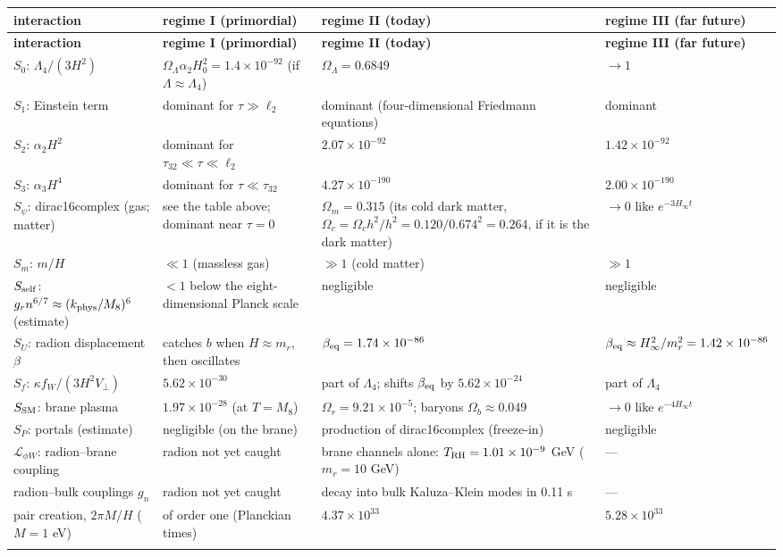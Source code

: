 \documentclass[10pt,a4paper]{article}
\begin{document}
{\footnotesize
\begin{longtable}{>{\raggedright\arraybackslash}p{}>{\raggedright\arraybackslash}p{}>{\raggedright\arraybackslash}p{}>{\raggedright\arraybackslash}p{}}
\toprule
\textbf{interaction} & \textbf{regime I (primordial)} & \textbf{regime II (today)} & \textbf{regime III (far future)} \\
\midrule\endfirsthead
\toprule
\textbf{interaction} & \textbf{regime I (primordial)} & \textbf{regime II (today)} & \textbf{regime III (far future)} \\
\midrule\endhead
\endfoot
\bottomrule\endlastfoot
$S_0$: $\Lambda_4/(3H^2)$ & $\Omega_\Lambda\alpha_2H_0^2=1.4\times10^{-92}$ (if $\Lambda\approx\Lambda_4$) & $\Omega_\Lambda=0.6849$ & $\to1$ \\
$S_1$: Einstein term & dominant for $\tau\gg\ell_2$ & dominant (four-dimensional Friedmann equations) & dominant \\
$S_2$: $\alpha_2H^2$ & dominant for $\tau_{32}\ll\tau\ll\ell_2$ & $2.07\times10^{-92}$ & $1.42\times10^{-92}$ \\
$S_3$: $\alpha_3H^4$ & dominant for $\tau\ll\tau_{32}$ & $4.27\times10^{-190}$ & $2.00\times10^{-190}$ \\
$S_\psi$: dirac16complex (gas; matter) & see the table above; dominant near $\tau=0$ & $\Omega_m=0.315$ (its cold dark matter, $\Omega_c=\Omega_ch^2/h^2=0.120/0.674^2=0.264$, if it is the dark matter) & $\to0$ like $e^{-3H_\infty t}$ \\
$S_m$: $m/H$ & $\ll1$ (massless gas) & $\gg1$ (cold matter) & $\gg1$ \\
$S_{\rm self}$: $g_rn^{6/7}\approx(k_{\rm phys}/M_8)^6$ (estimate) & $<1$ below the eight-dimensional Planck scale & negligible & negligible \\
$S_U$: radion displacement $\beta$ & catches $b$ when $H\approx m_r$, then oscillates & $\beta_{\rm eq}=1.74\times10^{-86}$ & $\beta_{\rm eq}\approx H_\infty^2/m_r^2=1.42\times10^{-86}$ \\
$S_f$: $\kappa f_W/(3H^2V_\perp)$ & $5.62\times10^{-30}$ & part of $\Lambda_4$; shifts $\beta_{\rm eq}$ by $5.62\times10^{-24}$ & part of $\Lambda_4$ \\
$S_{\rm SM}$: brane plasma & $1.97\times10^{-28}$ (at $T=M_8$) & $\Omega_r=9.21\times10^{-5}$; baryons $\Omega_b\approx0.049$ & $\to0$ like $e^{-4H_\infty t}$ \\
$S_P$: portals (estimate) & negligible (on the brane) & production of dirac16complex (freeze-in) & negligible \\
$\mathcal L_{\phi W}$: radion–brane coupling & radion not yet caught & brane channels alone: $T_{\rm RH}=1.01\times10^{-9}$ GeV ($m_r=10$ GeV) & — \\
radion–bulk couplings $g_n$ & radion not yet caught & decay into bulk Kaluza–Klein modes in 0.11 s & — \\
pair creation, $2\pi M/H$ ($M=1$ eV) & of order one (Planckian times) & $4.37\times10^{33}$ & $5.28\times10^{33}$ \\*
\end{longtable}}
\end{document}
